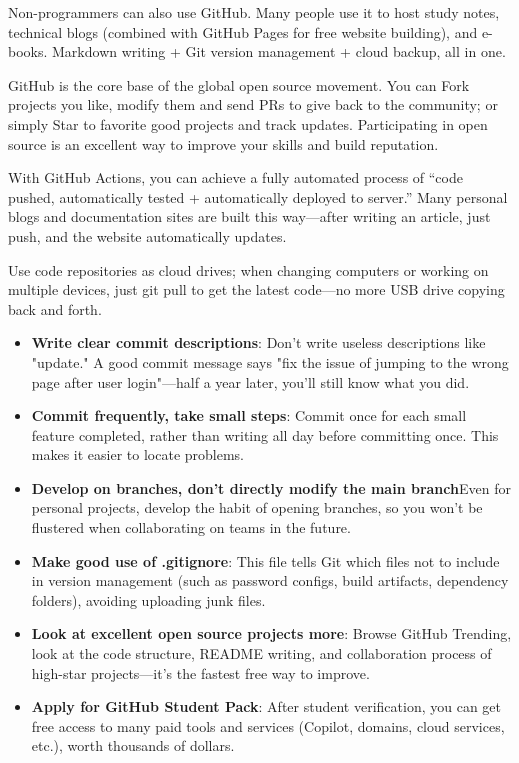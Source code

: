
Non-programmers can also use GitHub. Many people use it to host study notes, technical blogs (combined with GitHub Pages for free website building), and e-books. Markdown writing + Git version management + cloud backup, all in one.


GitHub is the core base of the global open source movement. You can Fork projects you like, modify them and send PRs to give back to the community; or simply Star to favorite good projects and track updates. Participating in open source is an excellent way to improve your skills and build reputation.


With GitHub Actions, you can achieve a fully automated process of “code pushed, automatically tested + automatically deployed to server.” Many personal blogs and documentation sites are built this way—after writing an article, just push, and the website automatically updates.


Use code repositories as cloud drives; when changing computers or working on multiple devices, just git pull to get the latest code—no more USB drive copying back and forth.


\begin{itemize}
  \item \textbf{Write clear commit descriptions}: Don't write useless descriptions like "update." A good commit message says "fix the issue of jumping to the wrong page after user login"—half a year later, you'll still know what you did.
  \item \textbf{Commit frequently, take small steps}: Commit once for each small feature completed, rather than writing all day before committing once. This makes it easier to locate problems.
  \item \textbf{Develop on branches, don't directly modify the main branch}Even for personal projects, develop the habit of opening branches, so you won't be flustered when collaborating on teams in the future.
  \item \textbf{Make good use of .gitignore}: This file tells Git which files not to include in version management (such as password configs, build artifacts, dependency folders), avoiding uploading junk files.
  \item \textbf{Look at excellent open source projects more}: Browse GitHub Trending, look at the code structure, README writing, and collaboration process of high-star projects—it's the fastest free way to improve.
  \item \textbf{Apply for GitHub Student Pack}: After student verification, you can get free access to many paid tools and services (Copilot, domains, cloud services, etc.), worth thousands of dollars.
\end{itemize}

